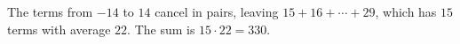 The terms from $-14$ to $14$ cancel in pairs, leaving $15+16+\cdots+29$, which has $15$ terms with average $22$. The sum is $15\cdot22=\boxed{330}$.
